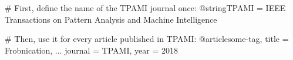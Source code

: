 # First, define the name of the TPAMI journal once:
@string{TPAMI = {IEEE Transactions on Pattern Analysis
                 and Machine Intelligence}}
                 
# Then, use it for every article published in TPAMI:
@article{some-tag,
  title = {{F}robnication},
  ...
  journal = TPAMI,
  year = {2018}
}
